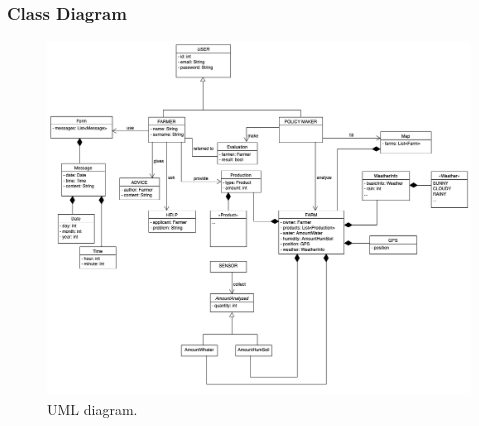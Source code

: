 \documentclass{article}
\begin{document}
\subsubsection{Class Diagram}
\begin{figure}[H]
    \begin{center}
    \includegraphics[width=1\textwidth]{images/UMLSW2_1.png}
    \caption{UML diagram.}
    \label{fig:dataaugmentation}
    \end{center}
\end{figure}
\end{document}
